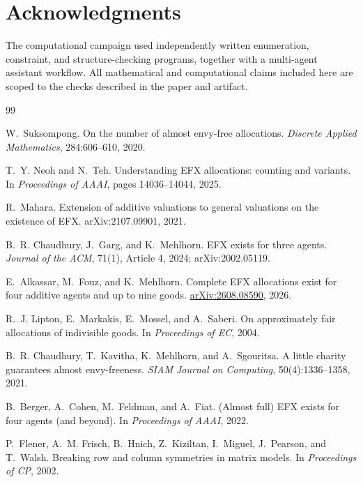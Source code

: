 \documentclass[11pt]{article}
\theoremstyle{plain}
\theoremstyle{definition}
\begin{document}
\section*{Acknowledgments}
The computational campaign used independently written enumeration, constraint,
and structure-checking programs, together with a multi-agent assistant workflow.
All mathematical and computational claims included here are scoped to the
checks described in the paper and artifact.

\begin{thebibliography}{99}

W.~Suksompong.
\newblock On the number of almost envy-free allocations.
\newblock \emph{Discrete Applied Mathematics}, 284:606--610, 2020.

T.~Y. Neoh and N.~Teh.
\newblock Understanding EFX allocations: counting and variants.
\newblock In \emph{Proceedings of AAAI}, pages 14036--14044, 2025.

R.~Mahara.
\newblock Extension of additive valuations to general valuations on the
existence of EFX.
\newblock arXiv:2107.09901, 2021.

B.~R. Chaudhury, J.~Garg, and K.~Mehlhorn.
\newblock EFX exists for three agents.
\newblock \emph{Journal of the ACM}, 71(1), Article 4, 2024;
arXiv:2002.05119.

E.~Alkassar, M.~Fouz, and K.~Mehlhorn.
\newblock Complete EFX allocations exist for four additive agents and up to
nine goods.
\newblock \href{https://arxiv.org/abs/2608.08590}{arXiv:2608.08590}, 2026.

R.~J. Lipton, E.~Markakis, E.~Mossel, and A.~Saberi.
\newblock On approximately fair allocations of indivisible goods.
\newblock In \emph{Proceedings of EC}, 2004.

B.~R. Chaudhury, T.~Kavitha, K.~Mehlhorn, and A.~Sgouritsa.
\newblock A little charity guarantees almost envy-freeness.
\newblock \emph{SIAM Journal on Computing}, 50(4):1336--1358, 2021.

B.~Berger, A.~Cohen, M.~Feldman, and A.~Fiat.
\newblock (Almost full) EFX exists for four agents (and beyond).
\newblock In \emph{Proceedings of AAAI}, 2022.

P.~Flener, A.~M. Frisch, B.~Hnich, Z.~Kiziltan, I.~Miguel, J.~Pearson, and
T.~Walsh.
\newblock Breaking row and column symmetries in matrix models.
\newblock In \emph{Proceedings of CP}, 2002.


\end{thebibliography}
\end{document}
